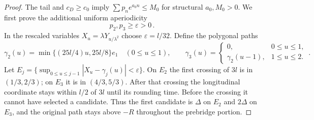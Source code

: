 \documentclass[11pt]{amsart}
\theoremstyle{definition}
\theoremstyle{remark}
\numberwithin{equation}{section}
\renewcommand{\epsilon}{\varepsilon}
\begin{document}
\begin{proof}
The tail and $c_D\geq c_0$ imply $\sum p_ne^{a_0n}\leq M_0$ for structural $a_0,M_0>0$. We first prove the additional uniform aperiodicity
\begin{equation}\label{rt:two-masses}
 p_2,p_3\geq\varepsilon>0\, .
\end{equation}
In the rescaled variables $X_u=\lambda Y_{u/\lambda^2}$ choose $\epsilon=l/32$. Define the polygonal paths
\begin{equation*}
 \gamma_2(u)=\min\{(25l/4)u,25l/8\}e_1\quad(0\leq u\leq1),
 \qquad
 \gamma_3(u)=\begin{cases}0,&0\leq u\leq1,\\
                      \gamma_2(u-1),&1\leq u\leq2.
                     \end{cases}\, .
\end{equation*}
Let $E_j=\{\sup_{0\leq u\leq j-1}|X_u-\gamma_j(u)|<\epsilon\}$. On $E_2$ the first crossing of $3l$ is in $(1/3,2/3)$; on $E_3$ it is in $(4/3,5/3)$. After that crossing the longitudinal coordinate stays within $l/2$ of $3l$ until its rounding time. Before the crossing it cannot have selected a candidate. Thus the first candidate is $\Delta$ on $E_2$ and $2\Delta$ on $E_3$, and the original path stays above $-R$ throughout the prebridge portion.


\end{proof}
\end{document}
